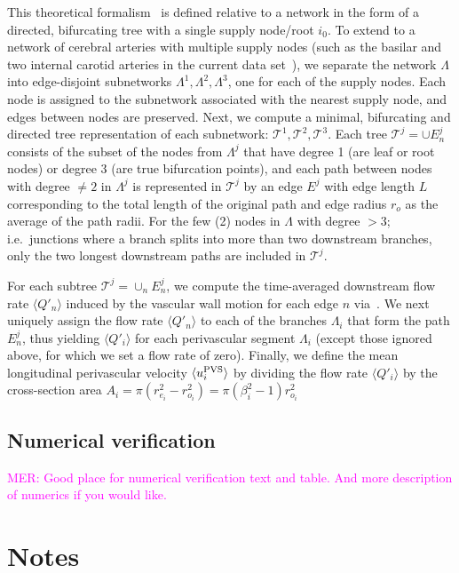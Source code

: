 \documentclass[fleqn,10pt]{wlscirep}
\newcommand{\mer}[1]{\textcolor{magenta}{#1}}
\begin{document}
This theoretical formalism~\cite{gjerde2023directional} is defined
relative to a network in the form of a directed, bifurcating tree with
a single supply node/root $i_0$. To extend to a network of cerebral
arteries with multiple supply nodes (such as the basilar and two
internal carotid arteries in the current data
set~\cite{hodneland2019new}), we separate the network $\Lambda$ into
edge-disjoint subnetworks $\Lambda^1, \Lambda^2, \Lambda^3$, one for
each of the supply nodes. Each node is assigned to the subnetwork
associated with the nearest supply node, and edges between nodes are
preserved. Next, we compute a minimal, bifurcating and directed tree
representation of each subnetwork: $\mathcal{T}^1, \mathcal{T}^2,
\mathcal{T}^3$. Each tree $\mathcal{T}^j = \cup E_n^j$ consists of the
subset of the nodes from $\Lambda^j$ that have degree 1 (are leaf or
root nodes) or degree $3$ (are true bifurcation points), and each path
between nodes with degree $\not = 2$ in $\Lambda^j$ is represented in
$\mathcal{T}^j$ by an edge $E^j$ with edge length $L$ corresponding to
the total length of the original path and edge radius $r_o$ as the
average of the path radii. For the few (2) nodes in $\Lambda$ with
degree $>3$; i.e.~junctions where a branch splits into more than two
downstream branches, only the two longest downstream paths are
included in $\mathcal{T}^j$.

For each subtree $\mathcal{T}^j = \cup_n E_n^j$, we compute the
time-averaged downstream flow rate $\langle Q'_n \rangle$ induced by
the vascular wall motion for each edge $n$ via~\cite[eq.~(5),
  (34)]{gjerde2023directional}. We next uniquely assign the flow rate
$\langle Q'_n \rangle$ to each of the branches $\Lambda_i$ that form
the path $E_n^j$, thus yielding $\langle Q'_i \rangle$ for each
perivascular segment $\Lambda_i$ (except those ignored above, for
which we set a flow rate of zero). Finally, we define the mean
longitudinal perivascular velocity $\langle u^{\rm PVS}_i \rangle$ by
dividing the flow rate $\langle Q'_i \rangle$ by the cross-section
area $A_i = \pi (r_{e_i}^2 - r_{o_i}^2) = \pi (\beta_i^2 - 1) r_{o_i}^2$

\subsection{Numerical verification}

\mer{MER: Good place for numerical verification text and table. And more description of numerics if you would like.}


\newpage
\section{Notes}
\end{document}
